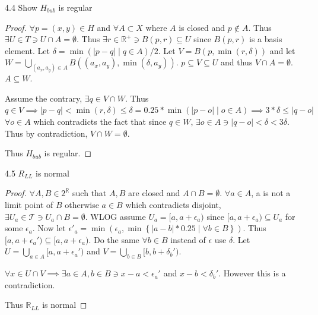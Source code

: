 \documentclass{article}
\newcommand*{\T}{\mathcal{T}}
\newcommand{\R}{\mathbb{R}}
\newcommand{\abs}[1]{\left\lvert #1\right\rvert}
\begin{document}
\bigskip

\begin{PROB}{4.4}\label{Problem 4.4.}
    Show $H_{bub}$ is regular 
\end{PROB}
\begin{proof}
    $\forall p =(x, y) \in H$ and $\forall A \subset X$ where $A$ is closed and $p \not \in A$. Thus $\exists U \in T \ni U \cap A = \emptyset$. Thus $\exists r \in \R^+ \ni B(p, r) \subseteq U$ since $B(p, r)$ is a basis element. Let $\delta = \min(\abs{p - q} \mid q \in A) / 2$. Let $V = B(p, \min(r, \delta))$ and let $W = \bigcup_{(a_x, a_y) \in A} B((a_x, a_y), \min(\delta, a_y))$. $p \subseteq V \subseteq U$ and thus $V \cap A = \emptyset$. $A \subseteq W$. 
    
    Assume the contrary, $\exists q \in V \cap W$. Thus $q \in V \implies \abs{p - q} < \min(r, \delta) \leq \delta = 0.25 * \min(\abs{p -o} \mid o \in A) \implies 3 * \delta \leq \abs{q - o}$ $\forall o \in A$ which contradicts the fact that since $q \in W$, $\exists o \in A \ni \abs{q - o} < \delta < 3 \delta$. Thus by contradiction, $V \cap W = \emptyset$. 
    
    Thus $H_{bub}$ is regular.  
\end{proof}

\bigskip

\begin{PROB}{4.5}\label{Problem 4.5.}
    $R_{L L}$ is normal 
\end{PROB}
\begin{proof}
    $\forall A, B \in 2^\R$ such that $A, B$ are closed and $A \cap B = \emptyset$. $\forall a \in A$, a is not a limit point of $B$ otherwise $a \in B$ which contradicts disjoint, $\exists U_a \in \T \ni U_a \cap B = \emptyset$. WLOG assume $U_a = [a, a + \epsilon_a)$ since $[a, a + \epsilon_a) \subseteq U_a$ for some $\epsilon_a$. Now let $\epsilon'_a = \min(\epsilon_a, \min\left\{ \abs{a - b} * 0.25 \mid \forall b \in B \right\})$. Thus $[a, a + \epsilon_a') \subseteq [a, a + \epsilon_a)$. Do the same $\forall b \in B$ instead of $\epsilon$ use $\delta$. Let $U = \bigcup_{a \in A}[a, a + \epsilon_a')$ and $V = \bigcup_{b \in B} [b, b + \delta_b')$. 
    
    $\forall x \in U \cap V \implies \exists a \in A, b \in B \ni x - a < \epsilon_a'$ and $x - b < \delta_b'$. However this is a contradiction. 
    
    Thus $\R_{L L}$ is normal 
\end{proof}

\bigskip
\end{document}
